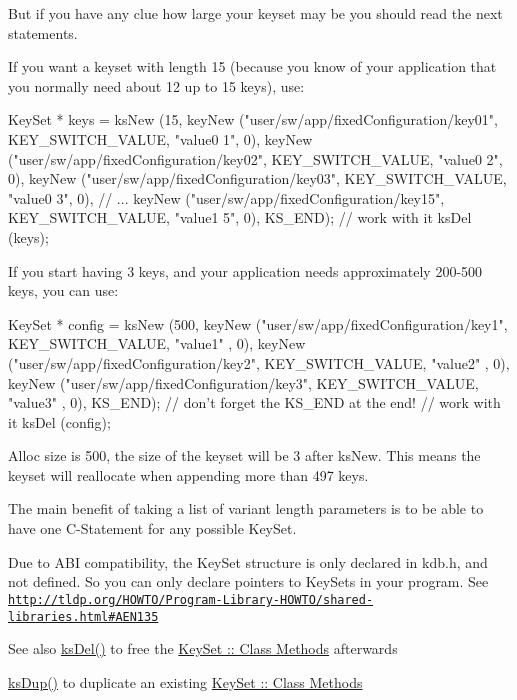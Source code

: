 But if you have any clue how large your keyset may be you should read the next statements.

If you want a keyset with length 15 (because you know of your application that you normally need about 12 up to 15 keys), use: 
\begin{DoxyCode}
KeySet * keys = ksNew (15,
        keyNew ("user/sw/app/fixedConfiguration/key01", KEY_SWITCH_VALUE, "value0
      1", 0),
        keyNew ("user/sw/app/fixedConfiguration/key02", KEY_SWITCH_VALUE, "value0
      2", 0),
        keyNew ("user/sw/app/fixedConfiguration/key03", KEY_SWITCH_VALUE, "value0
      3", 0),
        // ...
        keyNew ("user/sw/app/fixedConfiguration/key15", KEY_SWITCH_VALUE, "value1
      5", 0),
        KS_END);
// work with it
ksDel (keys);
\end{DoxyCode}


If you start having 3 keys, and your application needs approximately 200-\/500 keys, you can use: 
\begin{DoxyCode}
KeySet * config = ksNew (500,
        keyNew ("user/sw/app/fixedConfiguration/key1", KEY_SWITCH_VALUE, "value1"
      , 0),
        keyNew ("user/sw/app/fixedConfiguration/key2", KEY_SWITCH_VALUE, "value2"
      , 0),
        keyNew ("user/sw/app/fixedConfiguration/key3", KEY_SWITCH_VALUE, "value3"
      , 0),
        KS_END); // don't forget the KS_END at the end!
// work with it
ksDel (config);
\end{DoxyCode}
 Alloc size is 500, the size of the keyset will be 3 after ksNew. This means the keyset will reallocate when appending more than 497 keys.

The main benefit of taking a list of variant length parameters is to be able to have one C-\/Statement for any possible KeySet.

Due to ABI compatibility, the {\ttfamily KeySet} structure is only declared in kdb.h, and not defined. So you can only declare {\ttfamily pointers} to {\ttfamily KeySets} in your program. See \href{http://tldp.org/HOWTO/Program-Library-HOWTO/shared-libraries.html#AEN135}{\tt http://tldp.org/HOWTO/Program-\/Library-\/HOWTO/shared-\/libraries.html\#AEN135}

\begin{DoxySeeAlso}{See also}
\hyperlink{group__keyset_ga27e5c16473b02a422238c8d970db7ac8}{ksDel()} to free the \hyperlink{group__keyset}{KeySet :: Class Methods} afterwards 

\hyperlink{group__keyset_gac59e4b328245463f1451f68d5106151c}{ksDup()} to duplicate an existing \hyperlink{group__keyset}{KeySet :: Class Methods} 
\end{DoxySeeAlso}

